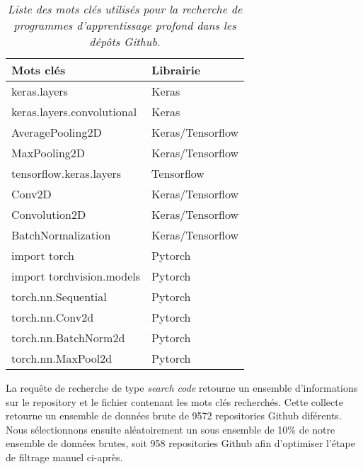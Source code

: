 \begin{table}[h]
  \centering
  \caption{\emph{Liste des mots clés utilisés pour la recherche de programmes d'apprentissage profond dans les dépôts Github.}}
  \label{tab:keywords}
  \begin{tabular}{|l|l|}
    \hline
    \textbf{Mots clés}         & \textbf{Librairie} \\ \hline
    keras.layers               & Keras              \\ \hline
    keras.layers.convolutional & Keras              \\ \hline
    AveragePooling2D           & Keras/Tensorflow   \\ \hline
    MaxPooling2D               & Keras/Tensorflow   \\ \hline
    tensorflow.keras.layers    & Tensorflow         \\ \hline
    Conv2D                     & Keras/Tensorflow   \\ \hline
    Convolution2D              & Keras/Tensorflow   \\ \hline
    BatchNormalization         & Keras/Tensorflow   \\ \hline
    import torch               & Pytorch            \\ \hline
    import torchvision.models  & Pytorch            \\ \hline
    torch.nn.Sequential        & Pytorch            \\ \hline
    torch.nn.Conv2d            & Pytorch            \\ \hline
    torch.nn.BatchNorm2d       & Pytorch            \\ \hline
    torch.nn.MaxPool2d         & Pytorch            \\ \hline
  \end{tabular}
\end{table}


La requête de recherche de type \emph{search code} retourne un ensemble
d'informations sur le repository et le fichier contenant les mots clés
recherchés. Cette collecte retourne un ensemble de données brute de 9572
repositories Github diférents. Nous sélectionnons ensuite aléatoirement un sous
ensemble de 10\% de notre ensemble de données brutes, soit 958 repositories
Github afin d'optimiser l'étape de filtrage manuel ci-après.

